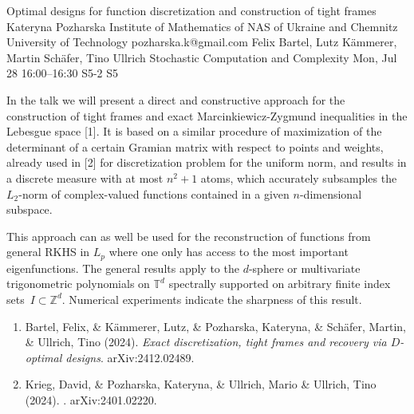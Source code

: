 \documentclass[12pt,lettersize,oneside]{book} %
\begin{document}
\begin{talk}
  {Optimal designs for function discretization and construction of tight frames}%
  {Kateryna Pozharska}%
  {Institute of Mathematics of NAS of Ukraine and Chemnitz University of Technology}%
  {pozharska.k@gmail.com}%
  {Felix Bartel,  Lutz K\"ammerer,  Martin Sch\"afer, Tino Ullrich}%
  {Stochastic Computation and Complexity}%
  {Mon, Jul 28 16:00--16:30}%
  {S5-2}%
  {S5}%
    


In the talk we will present a direct and constructive approach for the construction of tight frames and exact Marcinkiewicz-Zygmund inequalities in the Lebesgue space [1]. 
It is based on a similar procedure of maximization of the determinant of a certain Gramian matrix with respect to points and weights, already used in [2] for discretization problem for the uniform norm, and results in a discrete measure  with at most $n^2+1$ atoms, which accurately subsamples the $L_2$-norm of complex-valued functions contained in a  given $n$-dimensional subspace.

This approach can as well be used for the reconstruction of functions from general RKHS in $L_p$ where one only has access to the most important eigenfunctions. The general results apply to the $d$-sphere or multivariate trigonometric polynomials on $\mathbb{T}^d$ spectrally supported on arbitrary finite index sets~$I \subset \mathbb{Z}^d$.  Numerical experiments indicate the sharpness of this result. 


\begin{enumerate}
 \item[{[1]}]  Bartel, Felix,  \& K\"ammerer, Lutz,  \& Pozharska,  Kateryna, \& Sch\"afer, Martin,  \& \newline Ullrich, Tino (2024). {\it Exact discretization, tight frames and recovery via $D$-optimal designs}. arXiv:2412.02489.
    
 \item[{[2]}] Krieg, David, \&  Pozharska, Kateryna, \& Ullrich, Mario \&  Ullrich, Tino (2024). . arXiv:2401.02220.

\end{enumerate}


\end{talk}
\end{document}
